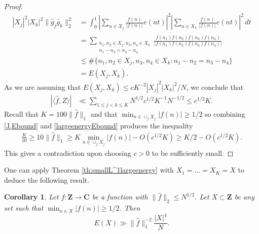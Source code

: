 \documentclass[11pt, reqno]{amsart}
\newtheorem{cor}[theorem]{Corollary}
\begin{document}
\begin{proof}
\begin{align*}
|X_j|^2|X_k|^2\lVert\hat{g}_j\hat{g}_k\rVert_2^2&=\int_0^1\left|\sum_{n\in X_j}\frac{f(n)}{|f(n)|}e(nt)\right|^2\left|\sum_{n\in X_k}\frac{f(n)}{|f(n)|}e(nt)\right|^2\,dt\\
    &=\sum_{\substack{n_1,n_2\in X_j,n_3,n_4\in X_k\\n_1-n_2=n_3-n_4}}\frac{f(n_1)\overline{f(n_2)f(n_3)}f(n_4)}{|f(n_1)f(n_2)f(n_3)f(n_4)|}\\
    &\leqslant \#\{n_1,n_2\in X_j,n_3,n_4\in X_k:n_1-n_2=n_3-n_4\}\\
    &=E(X_j,X_k).
\end{align*}
As we are assuming that $E(X_j,X_k)\leqslant cK^{-2}|X_j|^2|X_k|^2/N$, we conclude that 
\begin{align}\label{largeenergyEbound}
    |\langle \hat{f},Z\rangle|&\ll \sum_{1\leqslant j<k\leqslant K} N^{1/2}c^{1/2}K^{-1}N^{-1/2}\leqslant c^{1/2}K.
\end{align}
Recall that $K=100\lVert \hat{f}\rVert_1$ and that $\min_{n\in \cup_j X_j}|f(n)|\geqslant 1/2$ so combining \eqref{J,Ebound} and \eqref{largeenergyEbound} produces the inequality
\begin{align*}
    \frac{K}{10}\geqslant 10\lVert \hat{f}\rVert_1\geqslant K \min_{n\in \cup_j X_j}|f(n)|-O(c^{1/2}K)\geqslant K/2-O(c^{1/2}K).
\end{align*}
This gives a contradiction upon choosing $c>0$ to be sufficiently small.

\end{proof}
One can apply Theorem \ref{th:smallL^1largeenergy} with $X_1=\dots=X_K=X$ to deduce the following result.
\begin{cor}\label{cor:smallL^1largeenergy}
    Let $f:\mathbf{Z}\to\mathbf{C}$ be a function with $\lVert \hat{f}\rVert_2\leqslant N^{1/2}$. Let $X\subset \mathbf{Z}$ be any set such that $\min_{n\in X}|f(n)|\geqslant 1/2$. Then 
    \begin{equation}\label{largeenergythm}
       E(X)\gg \lVert \hat{f}\rVert_1^{-2}\frac{|X|^4}{N}. 
    \end{equation}
\end{cor}
\end{document}
